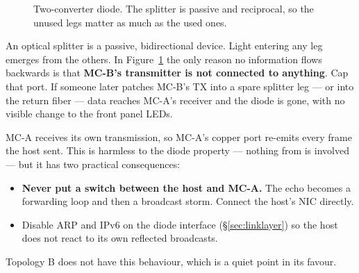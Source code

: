 \documentclass[11pt,a4paper]{article}
\begin{document}
\begin{figure}[h]
\centering
{}
\caption{Two-converter diode. The splitter is passive and reciprocal, so the
         unused legs matter as much as the used ones.}
\label{fig:splitter}
\end{figure}

\begin{warnbox}
An optical splitter is a passive, bidirectional device. Light entering any leg
emerges from the others. In Figure~\ref{fig:splitter} the only reason no
information flows backwards is that \textbf{MC-B's transmitter is not
connected to anything}. Cap that port. If someone later patches MC-B's TX into
a spare splitter leg --- or into the return fiber --- \dstside{} data reaches
MC-A's receiver and the diode is gone, with no visible change to the front
panel LEDs.
\end{warnbox}

\begin{notebox}
MC-A receives its own transmission, so MC-A's copper port re-emits every frame
the \srcside{} host sent. This is harmless to the diode property --- nothing
from \dstside{} is involved --- but it has two practical consequences:
\begin{itemize}
\item \textbf{Never put a switch between the \srcside{} host and MC-A.} The
      echo becomes a forwarding loop and then a broadcast storm. Connect the
      host's NIC directly.
\item Disable ARP and IPv6 on the diode interface (\S\ref{sec:linklayer}) so
      the host does not react to its own reflected broadcasts.
\end{itemize}
Topology B does not have this behaviour, which is a quiet point in its favour.
\end{notebox}
\end{document}
